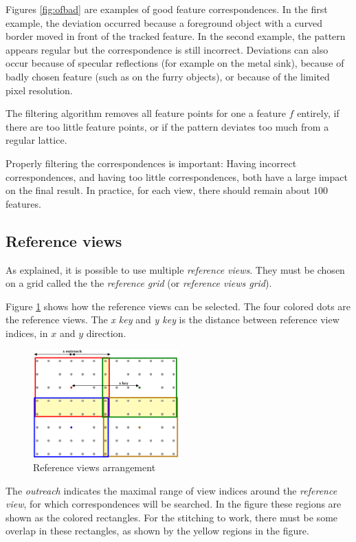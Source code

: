 \documentclass[11pt]{scrreprt}
\begin{document}
Figures \ref{fig:ofbad} are examples of good feature correspondences. In the first example, the deviation occurred because a foreground object with a curved border moved in front of the tracked feature. In the second example, the pattern appears regular but the correspondence is still incorrect. Deviations can also occur because of specular reflections (for example on the metal sink), because of badly chosen feature (such as on the furry objects), or because of the limited pixel resolution.

The filtering algorithm removes all feature points for one a feature $f$ entirely, if there are too little feature points, or if the pattern deviates too much from a regular lattice.

Properly filtering the correspondences is important: Having incorrect correspondences, and having too little correspondences, both have a large impact on the final result. In practice, for each view, there should remain about $100$ features.


\subsection{Reference views}
\label{sec:refviews}
As explained, it is possible to use multiple \emph{reference views}. They must be chosen on a grid called the the \emph{reference grid} (or \emph{reference views grid}).

Figure \ref{fig:refview} shows how the reference views can be selected. The four colored dots are the reference views. The \emph{x key} and \emph{y key} is the distance between reference view indices, in $x$ and $y$ direction.

\begin{figure}[h]
\centering
\includegraphics[width=0.5\textwidth]{refview.pdf}
\caption{Reference views arrangement}
\label{fig:refview}
\end{figure}

The \emph{outreach} indicates the maximal range of view indices around the \emph{reference view}, for which correspondences will be searched. In the figure these regions are shown as the colored rectangles. For the stitching to work, there must be some overlap in these rectangles, as shown by the yellow regions in the figure.
\end{document}
